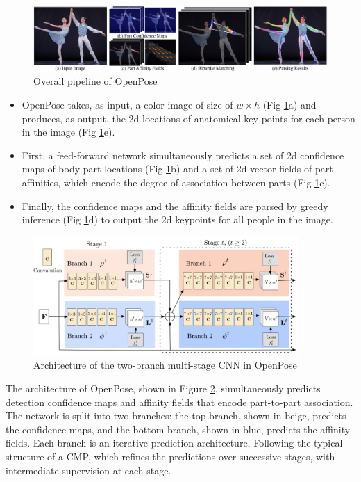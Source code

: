 \begin{figure}[htbp]
\centering\includegraphics[scale=0.325]{./img/paf.png}
\caption{Overall pipeline of OpenPose}\label{fig:paf}
\end{figure}

\begin{itemize}
\item OpenPose takes, as input, a color image of size of $w \times h$ (Fig \ref{fig:paf}a) and produces, as output, the 2d locations of anatomical key-points for each person in the image (Fig \ref{fig:paf}e).\cite{cao2017realtime} 
\item First, a feed-forward network simultaneously predicts a set of 2d confidence maps of body part locations (Fig \ref{fig:paf}b) and a set of 2d vector fields of part affinities, which encode the degree of association between parts (Fig \ref{fig:paf}c).
\item Finally, the confidence maps and the affinity fields are parsed by greedy inference (Fig \ref{fig:paf}d) to output the 2d keypoints for all people in the image.
\end{itemize}

\begin{figure}[htbp]
\centering\includegraphics[width=0.9\textwidth]{./img/OpenPoseArchitecture.png}
\caption{Architecture of the two-branch multi-stage CNN in OpenPose}\label{fig:architecture}
\end{figure}

\par The architecture of OpenPose, shown in Figure \ref{fig:architecture}, simultaneously predicts detection confidence maps and affinity fields that encode part-to-part association. The network is split into two branches: the top branch, shown in beige, predicts the confidence maps, and the bottom branch, shown in blue, predicts the affinity fields. Each branch is an iterative prediction architecture, Following the typical structure of a CMP, which refines the predictions over successive stages, with intermediate supervision at each stage.

